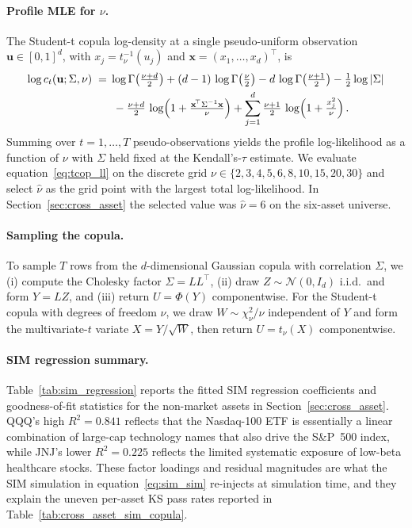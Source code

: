 \paragraph{Profile MLE for $\nu$.}
The Student-t copula log-density at a single pseudo-uniform observation $\mathbf{u} \in [0,1]^d$, with $x_j = t_\nu^{-1}(u_j)$ and $\mathbf{x} = (x_1, \dots, x_d)^\top$, is
\begin{align}
    \log c_t(\mathbf{u}; \Sigma, \nu)
    \;=\;&
    \log \Gamma\!\left(\tfrac{\nu+d}{2}\right)
    + (d-1)\,\log \Gamma\!\left(\tfrac{\nu}{2}\right)
    - d\,\log \Gamma\!\left(\tfrac{\nu+1}{2}\right)
    - \tfrac{1}{2} \log |\Sigma|
    \notag \\
    &\;
    - \tfrac{\nu+d}{2}\,\log\!\left(1 + \tfrac{\mathbf{x}^{\!\top} \Sigma^{-1} \mathbf{x}}{\nu}\right)
    + \sum_{j=1}^{d} \tfrac{\nu+1}{2}\,\log\!\left(1 + \tfrac{x_j^2}{\nu}\right).
    \label{eq:tcop_ll}
\end{align}
Summing over $t = 1, \dots, T$ pseudo-observations yields the profile log-likelihood as a function of $\nu$ with $\Sigma$ held fixed at the Kendall's-$\tau$ estimate.
We evaluate equation~\eqref{eq:tcop_ll} on the discrete grid $\nu \in \{2, 3, 4, 5, 6, 8, 10, 15, 20, 30\}$ and select $\hat{\nu}$ as the grid point with the largest total log-likelihood.
In Section~\ref{sec:cross_asset} the selected value was $\hat{\nu} = 6$ on the six-asset universe.

\paragraph{Sampling the copula.}
To sample $T$ rows from the $d$-dimensional Gaussian copula with correlation $\Sigma$, we (i) compute the Cholesky factor $\Sigma = L L^\top$, (ii) draw $Z \sim \mathcal{N}(0, I_d)$ i.i.d.\ and form $Y = L Z$, and (iii) return $U = \Phi(Y)$ componentwise.
For the Student-t copula with degrees of freedom $\nu$, we draw $W \sim \chi^2_\nu / \nu$ independent of $Y$ and form the multivariate-$t$ variate $X = Y / \sqrt{W}$, then return $U = t_\nu(X)$ componentwise.

\paragraph{SIM regression summary.}
Table~\ref{tab:sim_regression} reports the fitted SIM regression coefficients and goodness-of-fit statistics for the non-market assets in Section~\ref{sec:cross_asset}.
QQQ's high $R^2 = 0.841$ reflects that the Nasdaq-100 ETF is essentially a linear combination of large-cap technology names that also drive the S\&P~500 index, while JNJ's lower $R^2 = 0.225$ reflects the limited systematic exposure of low-beta healthcare stocks.
These factor loadings and residual magnitudes are what the SIM simulation in equation~\eqref{eq:sim_sim} re-injects at simulation time, and they explain the uneven per-asset KS pass rates reported in Table~\ref{tab:cross_asset_sim_copula}.

